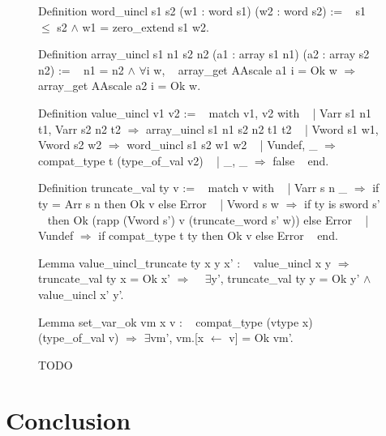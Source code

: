 \documentclass{article}
\begin{document}
\begin{figure}[t]
\obeylines\obeyspaces\ttfamily%
Definition word\_uincl s1 s2 (w1 : word s1) (w2 : word s2) :=
~ s1 \(\leq\) s2 \(\wedge\) w1 = zero\_extend s1 w2.

Definition array\_uincl s1 n1 s2 n2 (a1 : array s1 n1) (a2 : array s2 n2) :=
~ n1 = n2 \(\wedge\) \(\forall\)i w,
~   array\_get AAscale a1 i = Ok w \(\Longrightarrow\) array\_get AAscale a2 i = Ok w.

Definition value\_uincl v1 v2 :=
~ match v1, v2 with
~ | Varr s1 n1 t1, Varr s2 n2 t2 \(\Rightarrow\) array\_uincl s1 n1 s2 n2 t1 t2
~ | Vword s1 w1,   Vword s2 w2   \(\Rightarrow\) word\_uincl s1 s2 w1 w2
~ | Vundef,        \_             \(\Rightarrow\) compat\_type t (type\_of\_val v2)
~ | \_,             \_             \(\Rightarrow\) false
~ end.

Definition truncate\_val ty v :=
~ match v with
~ | Varr s n \_ \(\Rightarrow\) if ty = Arr s n then Ok v else Error
~ | Vword s w \(\Rightarrow\) if ty is sword s'
~   then Ok (rapp (Vword s') v (truncate\_word s' w)) else Error
~ | Vundef \(\Rightarrow\) if compat\_type t ty then Ok v else Error
~ end.

Lemma value\_uincl\_truncate ty x y x' :
~ value\_uincl x y \(\Longrightarrow\) truncate\_val ty x = Ok x' \(\Longrightarrow\)
~ \(\exists\)y', truncate\_val ty y = Ok y' \(\wedge\) value\_uincl x' y'.

Lemma set\_var\_ok vm x v :
~ compat\_type (vtype x) (type\_of\_val v) \(\Longrightarrow\) \(\exists\)vm', vm.[x \(\leftarrow\) v] = Ok vm'.
\normalfont%
\caption{TODO}
\end{figure}




\section{Conclusion}\label{sec:ccl}
\end{document}
